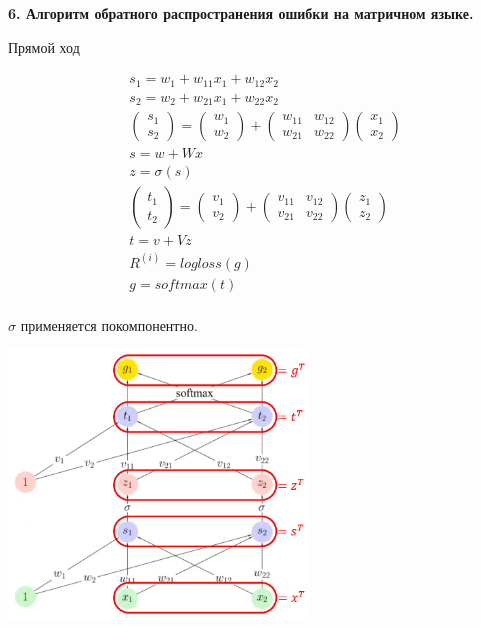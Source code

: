 \documentclass{report}
\begin{document}
\newpage

\par \textbf{6. Алгоритм обратного распространения ошибки на матричном языке.}
\par Прямой ход

\begin{align*}
& s_1 = w_1 + w_{11} x_1 + w_{12} x_2 \\
& s_2 = w_2 + w_{21} x_1 + w_{22} x_2 \\
& \begin{pmatrix} s_1 \\ s_2 \end{pmatrix} = \begin{pmatrix} w_1 \\ w_2 \end{pmatrix} + \begin{pmatrix} w_{11} & w_{12} \\ w_{21} & w_{22} \end{pmatrix} \begin{pmatrix} x_1 \\ x_2 \end{pmatrix} \\
& s = w + W x \\
& z = \sigma(s) \\
& \begin{pmatrix} t_1 \\ t_2 \end{pmatrix} = \begin{pmatrix} v_1 \\ v_2 \end{pmatrix} + \begin{pmatrix} v_{11} & v_{12} \\ v_{21} & v_{22} \end{pmatrix} \begin{pmatrix} z_1 \\ z_2 \end{pmatrix} \\
& t = v + V z \\
& R^{(i)} = logloss(g) \\
& g = softmax(t) \\
\end{align*}

\par $\sigma$ применяется покомпонентно.

\includegraphics[width=0.6\textwidth]{exam/netletters.png}
\end{document}

